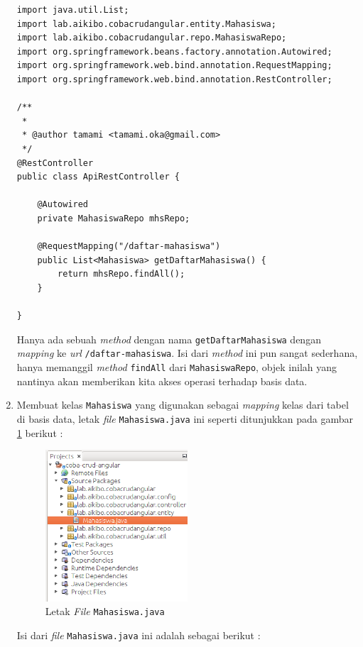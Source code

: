\begin{enumerate}
\begin{lstlisting}
import java.util.List;
import lab.aikibo.cobacrudangular.entity.Mahasiswa;
import lab.aikibo.cobacrudangular.repo.MahasiswaRepo;
import org.springframework.beans.factory.annotation.Autowired;
import org.springframework.web.bind.annotation.RequestMapping;
import org.springframework.web.bind.annotation.RestController;

/**
 *
 * @author tamami <tamami.oka@gmail.com>
 */
@RestController
public class ApiRestController {
    
    @Autowired
    private MahasiswaRepo mhsRepo;
    
    @RequestMapping("/daftar-mahasiswa")
    public List<Mahasiswa> getDaftarMahasiswa() {
        return mhsRepo.findAll();
    }
    
}
	\end{lstlisting}
	
	Hanya ada sebuah \textit{method} dengan nama \texttt{getDaftarMahasiswa} dengan \textit{mapping} ke \textit{url} \texttt{/daftar-mahasiswa}. Isi dari \textit{method} ini pun sangat sederhana, hanya memanggil \textit{method} \texttt{findAll} dari \texttt{MahasiswaRepo}, objek inilah yang nantinya akan memberikan kita akses operasi terhadap basis data.
	
	\item Membuat kelas \texttt{Mahasiswa} yang digunakan sebagai \textit{mapping} kelas dari tabel di basis data, letak \textit{file} \texttt{Mahasiswa.java} ini seperti ditunjukkan pada gambar \ref{fig:letak-mahasiswa} berikut :
	
	\begin{figure}[H]
		\centering
		\includegraphics[width=0.5\textwidth]{./resources/032-letak-mahasiswa}
		\caption{Letak \textit{File} \texttt{Mahasiswa.java}}
		\label{fig:letak-mahasiswa}
	\end{figure}
	
	Isi dari \textit{file} \texttt{Mahasiswa.java} ini adalah sebagai berikut :
	

\end{enumerate}

